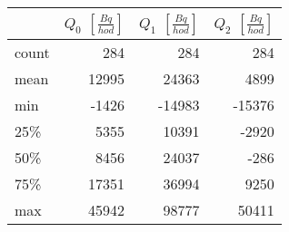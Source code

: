 \begin{tabular}{lrrr}
\toprule
{} &  $Q_0$ $\left[\si{\frac{Bq}{hod}}\right]$ &  $Q_1$ $\left[\si{\frac{Bq}{hod}}\right]$ &  $Q_2$ $\left[\si{\frac{Bq}{hod}}\right]$ \\
\midrule
count &                                       284 &                                       284 &                                       284 \\
mean  &                                     12995 &                                     24363 &                                      4899 \\
min   &                                     -1426 &                                    -14983 &                                    -15376 \\
25\%   &                                      5355 &                                     10391 &                                     -2920 \\
50\%   &                                      8456 &                                     24037 &                                      -286 \\
75\%   &                                     17351 &                                     36994 &                                      9250 \\
max   &                                     45942 &                                     98777 &                                     50411 \\
\bottomrule
\end{tabular}
